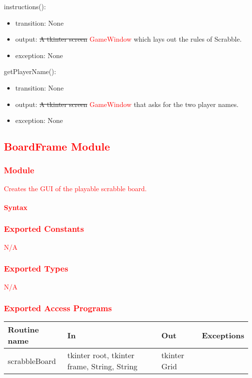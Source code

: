 \documentclass[12pt]{article}
\begin{document}
\noindent instructions():
\begin{itemize}
\item transition: None
\item output: \sout{A tkinter screen} \textcolor{red}{GameWindow} which lays out the rules of Scrabble.
\item exception: None
\end{itemize}

\noindent getPlayerName():
\begin{itemize}
\item transition: None
\item output: \sout{A tkinter screen} \textcolor{red}{GameWindow} that asks for the two player names.
\item exception: None
\end{itemize}

\subsection*{\textcolor{red}{BoardFrame Module}}

\subsubsection*{\textcolor{red}{Module}}

\textcolor{red}{Creates the GUI of the playable scrabble board.}

\paragraph*{\textcolor{red}{Syntax}}

\subsubsection*{\textcolor{red}{Exported Constants}}
\textcolor{red}{N/A}
\subsubsection*{\textcolor{red}{Exported Types}}

\textcolor{red}{N/A}

\subsubsection* {\textcolor{red}{Exported Access Programs}}
\textcolor{red}{
\begin{tabular}{| l | l | l | l |}
\hline
\textbf{Routine name} & \textbf{In} & \textbf{Out} & \textbf{Exceptions}\\
\hline
scrabbleBoard & tkinter root, tkinter frame, String, String & tkinter Grid & \\
\hline
\end{tabular}
}
\end{document}

